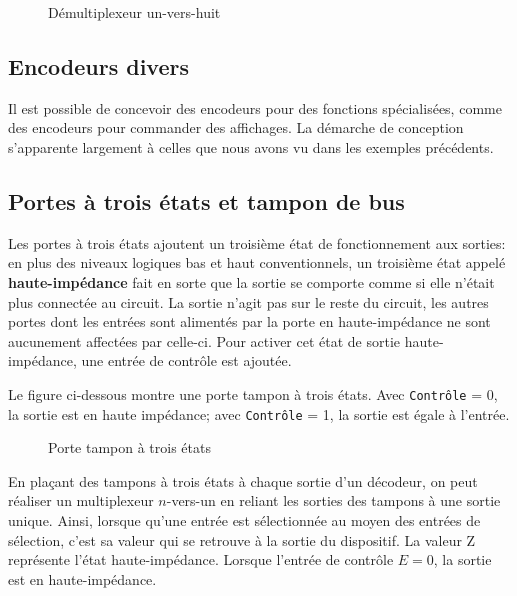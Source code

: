 \documentclass[11pt]{article}
\begin{document}
\begin{figure}[htbp]
\centering

\caption{\label{fig:org45ad101}Démultiplexeur un-vers-huit}
\end{figure}

\subsection{Encodeurs divers}
\label{sec:org1d74af8}

Il est possible de concevoir des encodeurs pour des fonctions
spécialisées, comme des encodeurs pour commander des affichages. La
démarche de conception s'apparente largement à celles que nous avons
vu dans les exemples précédents.


\subsection{Portes à trois états et tampon de bus}
\label{sec:org386ca57}

Les portes à trois états ajoutent un troisième état de fonctionnement
aux sorties: en plus des niveaux logiques bas et haut conventionnels,
un troisième état appelé \textbf{haute-impédance} fait en sorte que la sortie
se comporte comme si elle n'était plus connectée au circuit. La sortie
n'agit pas sur le reste du circuit, les autres portes dont les entrées
sont alimentés par la porte en haute-impédance ne sont aucunement
affectées par celle-ci. Pour activer cet état de sortie
haute-impédance, une entrée de contrôle est ajoutée.


Le figure ci-dessous montre une porte tampon à trois états. Avec
\texttt{Contrôle} = 0, la sortie est en haute impédance; avec  \texttt{Contrôle} = 1,
la sortie est égale à l'entrée.

\begin{figure}[htbp]
\centering

\caption{\label{fig:orgca48a80}Porte tampon à trois états}
\end{figure}

En plaçant des tampons à trois états à chaque sortie d'un décodeur, on
peut réaliser un multiplexeur \(n\)-vers-un en reliant les sorties des
tampons à une sortie unique. Ainsi, lorsque qu'une entrée est
sélectionnée au moyen des entrées de sélection, c'est sa valeur qui se
retrouve à la sortie du dispositif. La valeur Z représente l'état
haute-impédance.  Lorsque l'entrée de contrôle \(E = 0\), la sortie est
en haute-impédance.
\end{document}
